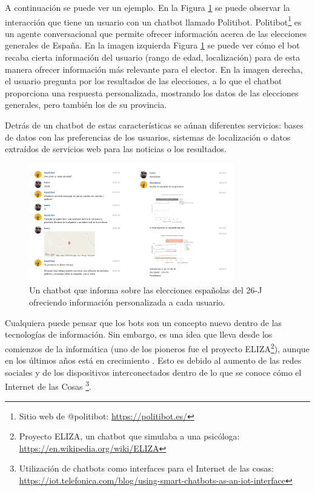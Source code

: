 A continuación se puede ver un ejemplo. En la Figura \ref{fig:Politibot} se puede observar la interacción que tiene un usuario con un chatbot llamado Politibot. Politibot\footnote{Sitio web de @politibot: \url{https://politibot.es/}} es un agente conversacional que permite ofrecer información acerca de las elecciones generales de España. En la imagen izquierda Figura \ref{fig:Politibot} se puede ver cómo el bot recaba cierta información del usuario (rango de edad, localización) para de esta manera ofrecer información más relevante para el elector. En la imagen derecha, el usuario pregunta por los resultados de las elecciones, a lo que el chatbot proporciona una respuesta personalizada, mostrando los datos de las elecciones generales, pero también los de su provincia.

Detrás de un chatbot de estas características se aúnan diferentes servicios: bases de datos con las preferencias de los usuarios, sistemas de localización o datos extraídos de servicios web para las noticias o los resultados.

\begin{figure}[htb]
	\centering
	\includegraphics[width=0.8\textwidth]{./figs/Politibot.png}
	\caption{Un chatbot que informa sobre las elecciones españolas del 26-J ofreciendo información personalizada a cada usuario.}
	\label{fig:Politibot}
\end{figure}

Cualquiera puede pensar que los bots son un concepto nuevo dentro de las tecnologías de información. Sin embargo, es una idea que lleva desde los comienzos de la informática (uno de los pioneros fue el proyecto ELIZA\footnote{Proyecto ELIZA, un chatbot que simulaba a una psicóloga: \url{https://en.wikipedia.org/wiki/ELIZA}}), aunque en los últimos años está en crecimiento \cite{Ferrara2016}. Esto es debido al aumento de las redes sociales y de los dispositivos interconectados dentro de lo que se conoce cómo el Internet de las Cosas \footnote{Utilización de chatbots como interfaces para el Internet de las cosas: \url{https://iot.telefonica.com/blog/using-smart-chatbots-as-an-iot-interface}}.

